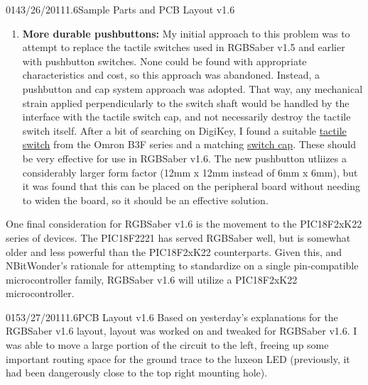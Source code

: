 \documentclass[12pt,letterpaper,onecolumn]{article}
\begin{document}
\begin{nbentry}{014}{3/26/2011}{1.6}{Sample Parts and PCB Layout v1.6}
\begin{enumerate}
\item \textbf{More durable pushbuttons:} My initial approach to this problem was to attempt to replace the tactile switches used in RGBSaber v1.5 and earlier with pushbutton switches. None could be found with appropriate characteristics and cost, so this approach was abandoned. Instead, a pushbutton and cap system approach was adopted. That way, any mechanical strain applied perpendicularly to the switch shaft would be handled by the interface with the tactile switch cap, and not necessarily destroy the tactile switch itself. After a bit of searching on DigiKey, I found a suitable \href{http://search.digikey.com/scripts/DkSearch/dksus.dll?Detail\&name=SW801-ND}{tactile switch} from the Omron B3F series and a matching \href{http://search.digikey.com/scripts/DkSearch/dksus.dll?vendor=0\&keywords=SW847-ND}{switch cap}. These should be very effective for use in RGBSaber v1.6. The new pushbutton utliizes a considerably larger form factor (12mm x 12mm instead of 6mm x 6mm), but it was found that this can be placed on the peripheral board without needing to widen the board, so it should be an effective solution.
\end{enumerate}
\indent One final consideration for RGBSaber v1.6 is the movement to the PIC18F2xK22 series of devices. The PIC18F2221 has served RGBSaber well, but is somewhat older and less powerful than the PIC18F2xK22 counterparts. Given this, and NBitWonder's rationale for attempting to standardize on a single pin-compatible microcontroller family, RGBSaber v1.6 will utilize a PIC18F2xK22 microcontroller.
\end{nbentry}

\begin{nbentry}{015}{3/27/2011}{1.6}{PCB Layout v1.6}
\indent Based on yesterday's explanations for the RGBSaber v1.6 layout, layout was worked on and tweaked for RGBSaber v1.6. I was able to move a large portion of the circuit to the left, freeing up some important routing space for the ground trace to the luxeon LED (previously, it had been dangerously close to the top right mounting hole).
\end{nbentry}
\end{document}
